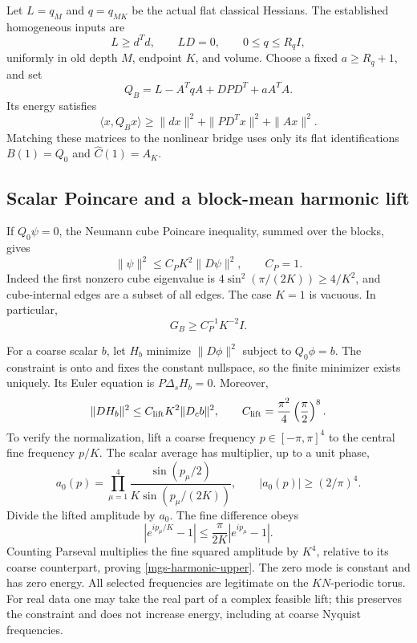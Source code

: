 Let \(L=q_M\) and \(q=q_{MK}\) be the actual flat classical
Hessians. The established homogeneous inputs are
\begin{equation}
 L\ge d^Td,\qquad LD=0,\qquad 0\le q\le R_qI,
 \label{mgs-classical-inputs}
\end{equation}
uniformly in old depth \(M\), endpoint \(K\), and volume.
Choose a fixed \(a\ge R_q+1\), and set
\begin{equation}
 Q_B=L-A^TqA+DPD^T+aA^TA.
 \label{mgs-vector}
\end{equation}
Its energy satisfies
\begin{equation}
 \langle x,Q_Bx\rangle
 \ge \|dx\|^2+\|PD^Tx\|^2+\|Ax\|^2.
 \label{mgs-energy-lower}
\end{equation}
Matching these matrices to the nonlinear bridge uses only its
flat identifications \(B(1)=Q_0\) and \(\widehat C(1)=A_K\).

\subsection{Scalar Poincare and a block-mean harmonic lift}
\label{mgs-scalar-section}

If \(Q_0\psi=0\), the Neumann cube Poincare inequality, summed
over the blocks, gives
\begin{equation}
 \|\psi\|^2\le C_PK^2\|D\psi\|^2,\qquad C_P=1.
 \label{mgs-poincare}
\end{equation}
Indeed the first nonzero cube eigenvalue is
\(4\sin^2(\pi/(2K))\ge4/K^2\), and cube-internal edges
are a subset of all edges.
The case \(K=1\) is vacuous.
In particular,
\begin{equation}
                         G_B\ge C_P^{-1}K^{-2}I.
 \label{mgs-ghost-gap}
\end{equation}

For a coarse scalar \(b\), let \(H_b\) minimize
\(\|D\phi\|^2\) subject to \(Q_0\phi=b\).
The constraint is onto and fixes the constant nullspace, so the
finite minimizer exists uniquely. Its Euler equation is
\(P\Delta_sH_b=0\).
Moreover,
\begin{equation}
 \|DH_b\|^2\le C_{\rm lift}K^2\|D_cb\|^2,\qquad
 C_{\rm lift}=\frac{\pi^2}{4}\left(\frac\pi2\right)^8.
 \label{mgs-harmonic-upper}
\end{equation}
To verify the normalization, lift a coarse frequency
\(p\in[-\pi,\pi]^4\) to the central fine frequency \(p/K\).
The scalar average has multiplier, up to a unit phase,
\[
 a_0(p)=\prod_{\mu=1}^4
      \frac{\sin(p_\mu/2)}{K\sin(p_\mu/(2K))},
 \qquad |a_0(p)|\ge(2/\pi)^4.
\]
Divide the lifted amplitude by \(a_0\).
The fine difference obeys
\[
 |e^{ip_\mu/K}-1|
       \le\frac{\pi}{2K}|e^{ip_\mu}-1|.
\]
Counting Parseval multiplies the fine squared amplitude by
\(K^4\), relative to its coarse counterpart, proving
\eqref{mgs-harmonic-upper}.
The zero mode is constant and has zero energy.
All selected frequencies are legitimate on the \(KN\)-periodic
torus. For real data one may take the real part of a complex
feasible lift; this preserves the constraint and does not
increase energy, including at coarse Nyquist frequencies.

